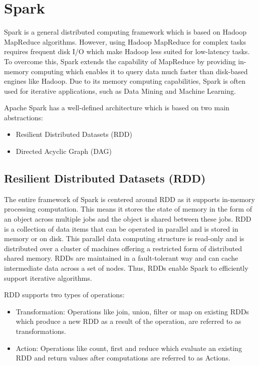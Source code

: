 \documentclass[sigconf]{acmart}
\begin{document}
\section{Spark}

Spark is a general distributed computing framework which is based on Hadoop MapReduce algorithms\cite{fu2016spark-p1}. However, using Hadoop MapReduce for complex tasks requires frequent disk I/O which make Hadoop less suited for low-latency tasks. To overcome this, Spark extends the capability of MapReduce by providing in-memory computing which enables it to query data much faster than disk-based engines like Hadoop\cite{spark-j1}. Due to its memory computing capabilities, Spark is often used for iterative applications, such as Data Mining and Machine Learning\cite{fu2016spark-p1}. 

Apache Spark has a well-defined architecture which is based on two main abstractions\cite{spark-a2}:
\begin{itemize}
	\item Resilient Distributed Datasets (RDD)
	\item Directed Acyclic Graph (DAG)
\end{itemize}

\subsection{Resilient Distributed Datasets (RDD)} 
The entire framework of Spark is centered around RDD as it supports in-memory processing computation. This means it stores the state of memory in the form of an object across multiple jobs and the object is shared between these jobs\cite{spark-j2}. RDD is a collection of data items that can be operated in parallel and is stored in memory or on disk. This parallel data computing structure is read-only and is distributed over a cluster of machines offering a restricted form of distributed shared memory. RDDs are maintained in a fault-tolerant way and can cache intermediate data across a set of nodes. Thus, RDDs enable Spark to efficiently support iterative algorithms\cite{marcu2016spark-p2}.

RDD supports two types of operations\cite{spark-a3}:
\begin{itemize}
	\item Transformation: Operations like join, union, filter or map on existing RDDs which produce a new RDD as a result of the operation, are referred to as transformations.
	\item Action: Operations like count, first and reduce which evaluate an existing RDD and return values after computations are referred to as Actions.
\end{itemize}
\end{document}
